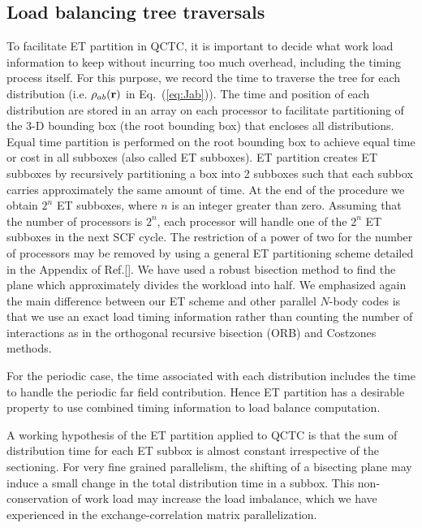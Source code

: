 \commentoutA{\documentclass[prl,aps,twocolumn,twocolumngrid,superbib]{revtex4}}
\begin{document}
\subsection{Load balancing tree traversals}
\label{ETPartition}
To facilitate ET partition in QCTC, it is important to decide what
work load information to keep without incurring too much overhead,
including the timing process itself.  For this purpose, we record the
time to traverse the tree for each distribution (i.e. $\rho_{ab}({\bf
r})$ in Eq.~(\ref{eq:Jab})). The time and position of each
distribution are stored in an array on each processor to facilitate
partitioning of the 3-D bounding box (the root bounding box) that
encloses all distributions. Equal time partition\cite{CGan03} is
performed on the root bounding box to achieve equal time or cost in
all subboxes (also called ET subboxes).  ET partition creates ET
subboxes by recursively partitioning a box into 2 subboxes such that
each subbox carries approximately the same amount of time. At the end
of the procedure we obtain $2^n$ ET subboxes, where $n$ is an integer
greater than zero.  Assuming that the number of processors is $2^n$,
each processor will handle one of the $2^n$ ET subboxes in the next
SCF cycle.  The restriction of a power of two for the number of
processors may be removed by using a general ET partitioning scheme
detailed in the Appendix of Ref.[].  We have used a
robust bisection method\cite{WPress92} to find the plane which
approximately divides the workload into half.  We emphasized again the
main difference between our ET scheme and other parallel $N$-body
codes\cite{MWarren92,Singh93} is that we use an exact load timing
information rather than counting the number of interactions as in the
orthogonal recursive bisection (ORB)\cite{MWarren92} and Costzones
methods\cite{Singh93}.

For the periodic case, the time associated with each distribution
includes the time to handle the periodic far
field\cite{MChallacombe97D,CTymczak04a} contribution. Hence ET
partition has a desirable property to use combined timing information
to load balance computation.


A working hypothesis of the ET partition applied to QCTC is that the
sum of distribution time for each ET subbox is almost constant
irrespective of the sectioning. For very fine grained parallelism, the
shifting of a bisecting plane may induce a small change in the total
distribution time in a subbox.  This non-conservation of work load may
increase the load imbalance, which we have experienced in the
exchange-correlation matrix parallelization\cite{CGan03}.
\end{document}
